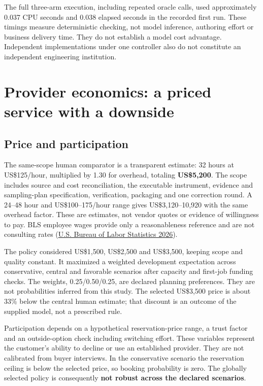 \documentclass[
  11pt,
  letterpaper,
]{article}
\begin{document}
The full three-arm execution, including repeated oracle calls, used
approximately 0.037 CPU seconds and 0.038 elapsed seconds in the
recorded first run. These timings measure deterministic checking, not
model inference, authoring effort or business delivery time. They do not
establish a model cost advantage. Independent implementations under one
controller also do not constitute an independent engineering
institution.

\hypertarget{provider-economics-a-priced-service-with-a-downside}{%
\section{Provider economics: a priced service with a
downside}\label{provider-economics-a-priced-service-with-a-downside}}

\hypertarget{price-and-participation}{%
\subsection{Price and participation}\label{price-and-participation}}

The same-scope human comparator is a transparent estimate: 32 hours at
US\$125/hour, multiplied by 1.30 for overhead, totaling
\textbf{US\$5,200}. The scope includes source and cost reconciliation,
the executable instrument, evidence and sampling-plan specification,
verification, packaging and one correction round. A 24--48 hour and
US\$100--175/hour range gives US\$3,120--10,920 with the same overhead
factor. These are estimates, not vendor quotes or evidence of
willingness to pay. BLS employee wages provide only a reasonableness
reference and are not consulting rates (\protect\hyperlink{ref-bls}{U.S.
Bureau of Labor Statistics 2026}).

The policy considered US\$1,500, US\$2,500 and US\$3,500, keeping scope
and quality constant. It maximized a weighted development expectation
across conservative, central and favorable scenarios after capacity and
first-job funding checks. The weights, 0.25/0.50/0.25, are declared
planning preferences. They are not probabilities inferred from this
study. The selected US\$3,500 price is about 33\% below the central
human estimate; that discount is an outcome of the supplied model, not a
prescribed rule.

Participation depends on a hypothetical reservation-price range, a trust
factor and an outside-option check including switching effort. These
variables represent the customer's ability to decline or use an
established provider. They are not calibrated from buyer interviews. In
the conservative scenario the reservation ceiling is below the selected
price, so booking probability is zero. The globally selected policy is
consequently \textbf{not robust across the declared scenarios}.
\end{document}
